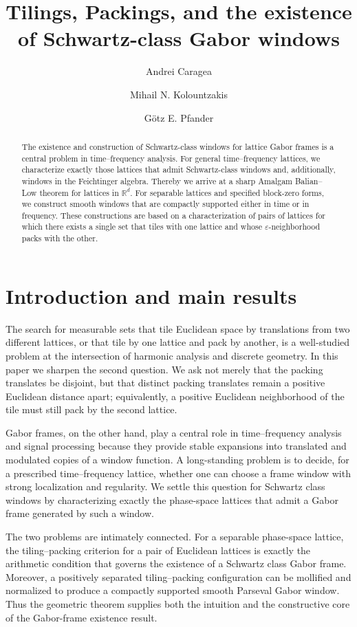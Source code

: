 \documentclass[11pt,reqno]{amsart}
\title[Tilings, packings, and the existence of Schwartz-class Gabor windows]{Tilings, Packings, and the existence of Schwartz-class Gabor windows}
\author[A. Caragea]{Andrei Caragea}
\author[M. N. Kolountzakis]{Mihail N. Kolountzakis}
\author[G. E. Pfander]{G\"otz E. Pfander}
\date{}
\numberwithin{equation}{section}
\theoremstyle{definition}
\theoremstyle{remark}
\newcommand{\R}{\mathbb R}
\begin{document}
\raggedbottom

\begin{abstract}
The existence and construction of Schwartz-class windows for lattice Gabor
frames is a central problem in time--frequency analysis.  For general
time--frequency lattices, we characterize exactly those lattices that admit
Schwartz-class windows and, additionally, windows in the Feichtinger algebra. 
Thereby we arrive at a sharp Amalgam Balian--Low theorem for lattices in $\R^d$.
For separable lattices and specified block-zero forms, we construct smooth
windows that are compactly supported either in time or in frequency.  These constructions are based on a
characterization of pairs of lattices for which there exists a single set
that tiles with one lattice and whose $\varepsilon$-neighborhood packs with
the other.  
\end{abstract}

\maketitle
\tableofcontents


\section{Introduction and main results}\label{sec:introduction}

The search for measurable sets that tile Euclidean space by translations
from two different lattices, or that tile by one lattice and pack by another,
is a well-studied problem at the intersection of harmonic analysis and
discrete geometry.  In this paper we sharpen the second question.  We ask
not merely that the packing translates be disjoint, but that distinct
packing translates remain a positive Euclidean distance apart; equivalently,
a positive Euclidean neighborhood of the tile must still pack by the second
lattice.

Gabor frames, on the other hand, play a central role in time--frequency analysis and signal
processing because they provide stable expansions into translated and
modulated copies of a window function.  A long-standing problem is to
decide, for a prescribed time--frequency lattice, whether one can choose a
frame window with strong localization and regularity.  We settle this
question for Schwartz class windows by characterizing exactly the
phase-space lattices that admit a Gabor frame generated by such a window.

The two problems are intimately connected.  For a separable phase-space
lattice, the tiling--packing criterion for a pair of Euclidean lattices is
exactly the arithmetic condition that governs the existence of a Schwartz
class Gabor frame.  Moreover, a positively separated tiling--packing
configuration can be mollified and normalized to produce a compactly
supported smooth Parseval Gabor window.  Thus the geometric theorem supplies
both the intuition and the constructive core of the Gabor-frame existence
result.
\end{document}
